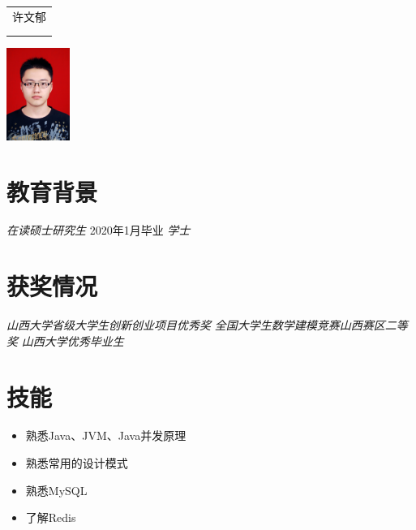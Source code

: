 \documentclass{resume}
\begin{document}

\medskip\noindent
\begin{minipage}{0.7\textwidth}
  \Large{
    \begin{tabu}  { l }
      \scshape{许文郁} \\
       \\
       \\
    \end{tabu}
  }
\end{minipage}
\begin{minipage}{0.3\textwidth}
  \raggedleft
  \includegraphics[height=30mm]{me}
\end{minipage}

\section{教育背景}
\textit{在读硕士研究生} {2020年1月毕业}
\textit{学士}

\section{获奖情况}
\textit{山西大学省级大学生创新创业项目优秀奖}
\textit{全国大学生数学建模竞赛山西赛区二等奖}
\textit{山西大学优秀毕业生}

\section{技能}
\begin{itemize}[parsep=0.5ex]
  \item 熟悉Java、JVM、Java并发原理
  \item 熟悉常用的设计模式
  \item 熟悉MySQL
  \item 了解Redis
\end{itemize}
\end{document}
